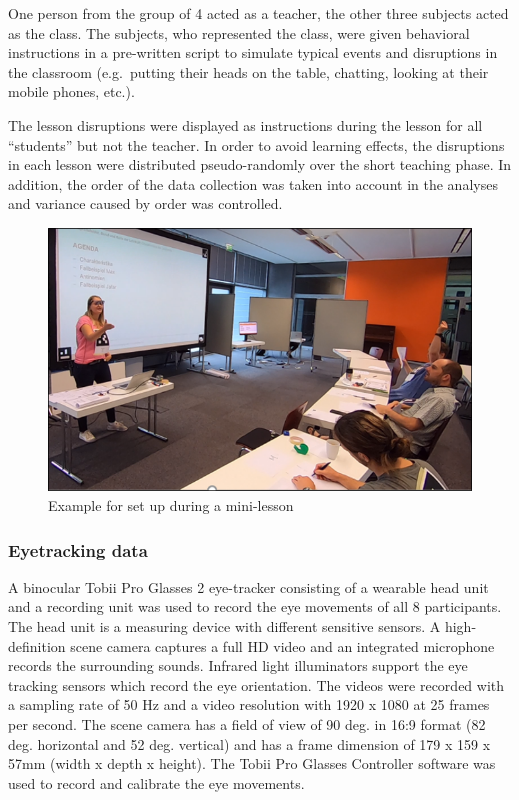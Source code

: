 \documentclass[
  english,
  man,floatsintext]{apa6}
\begin{document}
One person from the group of 4 acted as a teacher, the other three subjects acted as the class. The subjects, who represented the class, were given behavioral instructions in a pre-written script to simulate typical events and disruptions in the classroom (e.g.~putting their heads on the table, chatting, looking at their mobile phones, etc.).

The lesson disruptions were displayed as instructions during the lesson for all ``students'' but not the teacher. In order to avoid learning effects, the disruptions in each lesson were distributed pseudo-randomly over the short teaching phase. In addition, the order of the data collection was taken into account in the analyses and variance caused by order was controlled.



\begin{figure}

{\centering \includegraphics[width=5.94in]{./pictures/datacollection} 

}

\caption{Example for set up during a mini-lesson}\label{fig:datacollection}
\end{figure}

\hypertarget{eyetracking-data}{%
\subsubsection{Eyetracking data}\label{eyetracking-data}}

A binocular Tobii Pro Glasses 2 eye-tracker consisting of a wearable head unit and a recording unit was used to record the eye movements of all 8 participants. The head unit is a measuring device with different sensitive sensors. A high-definition scene camera captures a full HD video and an integrated microphone records the surrounding sounds. Infrared light illuminators support the eye tracking sensors which record the eye orientation. The videos were recorded with a sampling rate of 50 Hz and a video resolution with 1920 x 1080 at 25 frames per second. The scene camera has a field of view of 90 deg. in 16:9 format (82 deg. horizontal and 52 deg. vertical) and has a frame dimension of 179 x 159 x 57mm (width x depth x height). The Tobii Pro Glasses Controller software was used to record and calibrate the eye movements.
\end{document}
